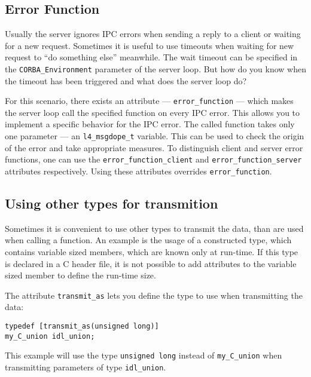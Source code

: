 \subsection{Error Function}
Usually the server ignores IPC errors when sending a reply to a client or
waiting for a new request. Sometimes it is useful to use timeouts when
waiting for new request to ``do something else'' meanwhile. The wait timeout 
can be specified in the \verb|CORBA_Environment| parameter of the
server loop. But how do you know when the timeout has been triggered and
what does the server loop do?

For this scenario, there exists an attribute --- \verb|error_function| --- which
makes the server loop call the specified function on every IPC error.
This allows you to implement a specific behavior for the IPC error. The
called function takes only one parameter --- an \verb|l4_msgdope_t| variable.
This can be used to check the origin of the error and take appropriate
measures.  To distinguish client and server error functions, one can
use the \verb|error_function_client| and \verb|error_function_server| attributes
respectively. Using these attributes overrides \verb|error_function|.



\subsection{Using other types for transmition}
Sometimes it is convenient to use other types to transmit the data,
than are used when calling a function. An example is the usage of
a constructed type, which contains variable sized members, which
are known only at run-time. If this type is declared in a C header
file, it is not possible to add attributes to the variable sized
member to define the run-time size. 

The attribute \verb|transmit_as| lets you define the type to use
when transmitting the data:
\begin{verbatim}
typedef [transmit_as(unsigned long)] 
my_C_union idl_union;
\end{verbatim}
This example will use the type \verb|unsigned long| instead of
\verb|my_C_union| when transmitting parameters of type \verb|idl_union|.


